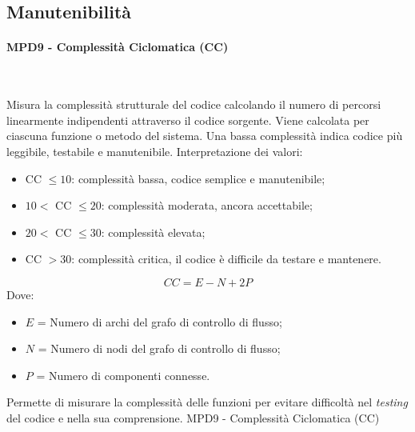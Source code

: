 \documentclass[10pt, letterpaper]{article}
\newcommand{\trisubsection}[1]{\paragraph{#1}\mbox{}\\}
\begin{document}
\subsection{Manutenibilità}

\trisubsection{MPD9 - Complessità Ciclomatica (CC)}
{Misura la complessità strutturale del codice calcolando il numero di percorsi
    linearmente indipendenti attraverso il codice sorgente. Viene calcolata per
    ciascuna funzione o metodo del sistema. Una bassa complessità indica codice
    più leggibile, testabile e manutenibile.
    Interpretazione dei valori:
    \begin{itemize}
        \item CC $\leq 10$: complessità bassa, codice semplice e manutenibile;
        \item $10 < $ CC $ \leq 20$: complessità moderata, ancora accettabile;
        \item $20 < $ CC $ \leq 30$: complessità elevata;
        \item CC $> 30$: complessità critica, il codice è difficile da testare e mantenere.
    \end{itemize}}
{\[ CC = E - N + 2P \]
    Dove:
    \begin{itemize}
        \item $E$ = Numero di archi del grafo di controllo di flusso;
        \item $N$ = Numero di nodi del grafo di controllo di flusso;
        \item $P$ = Numero di componenti connesse.
    \end{itemize}
}
{Permette di misurare la complessità delle funzioni per evitare difficoltà nel
    \textit{testing} del codice e nella sua comprensione.}
{MPD9 - Complessità Ciclomatica (CC)}
\end{document}
